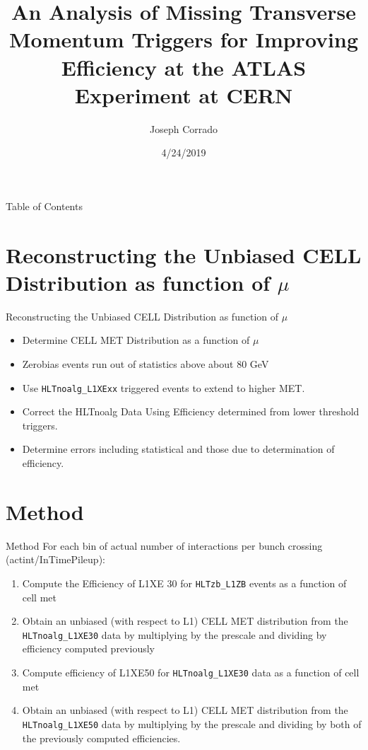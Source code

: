 \documentclass[draft]{beamer}
\title{An Analysis of Missing Transverse Momentum Triggers for Improving Efficiency at the ATLAS Experiment at CERN}
\author{Joseph Corrado}                 %
\institute{New York University}      %
\date{4/24/2019}                    %
\begin{document}
\begin{frame}
  \titlepage
\end{frame}
\begin{frame}{Table of Contents}
        \tableofcontents
\end{frame}
\section{Reconstructing the Unbiased CELL Distribution as function of $\mu$}
\begin{frame}{Reconstructing the Unbiased CELL Distribution as function of $\mu$}
\begin{itemize}
        \item Determine CELL MET Distribution as a function of $\mu$
        \item Zerobias events run out of statistics above about 80 GeV
        \item Use \texttt{HLTnoalg\_L1XExx} triggered events to extend to higher MET.
        \item Correct the HLTnoalg Data Using Efficiency determined from lower threshold triggers.
        \item Determine errors including statistical and those due to determination of efficiency.
\end{itemize}
\end{frame}
\section{Method}
\begin{frame}{Method}
For each bin of actual number of interactions per bunch crossing (actint/InTimePileup):
\begin{enumerate}
        \item Compute the Efficiency of L1XE 30 for \texttt{HLTzb\_L1ZB} events as a function of cell met
        \item Obtain an unbiased (with respect to L1) CELL MET distribution from the \texttt{HLTnoalg\_L1XE30} data by multiplying by the prescale and dividing by efficiency computed previously
        \item Compute efficiency of L1XE50 for \texttt{HLTnoalg\_L1XE30} data as a function of cell met
        \item Obtain an unbiased (with respect to L1) CELL MET distribution from the \texttt{HLTnoalg\_L1XE50} data by multiplying by the prescale and dividing by both of the previously computed efficiencies.
\end{enumerate}
\end{frame}
\end{document}
